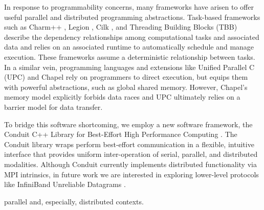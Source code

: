 In response to programmability concerns, many frameworks have arisen to offer useful parallel and distributed programming abstractions.
Task-based frameworks such as Charm++ \cite{kale1993charm++}, Legion \cite{bauer2012legion}, Cilk \cite{blumofe1996cilk}, and Threading Building Blocks (TBB) \cite{reinders2007intel} describe the dependency relationships among computational tasks and associated data and relies on an associated runtime to automatically schedule and manage execution.
These frameworks assume a deterministic relationship between tasks.
In a similar vein, programming languages and extensions like Unified Parallel C (UPC) \cite{el2006upc} and Chapel \cite{chamberlain2007parallel} rely on programmers to direct execution, but equips them with powerful abstractions, such as global shared memory.
However, Chapel's memory model explicitly forbids data races and UPC ultimately relies on a barrier model for data transfer.

To bridge this software shortcoming, we employ a new software framework, the Conduit C++ Library for Best-Effort High Performance Computing \cite{moreno2021conduit}.
The Conduit library wraps perform best-effort communication in a flexible, intuitive interface that provides uniform inter-operation of serial, parallel, and distributed modalities.
Although Conduit currently implements distributed functionality via MPI intrinsics, in future work we are interested in exploring lower-level protocols like InfiniBand Unreliable Datagrams \cite{kashyap2006ip, koop2007high}.


parallel and, especially, distributed contexts.
